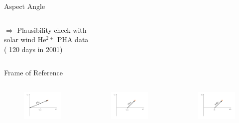 \documentclass{beamer}
\begin{document}
\begin{frame}{Aspect Angle}
\begin{columns}
\begin{center}
{\small 	$\Rightarrow$ Plausibility check with \\solar wind $\mathrm{He^{2+}}$ PHA data}\\{\scriptsize  ( 120 days in 2001)}
\end{center}
	\column[]{1cm}
\end{columns}


\end{frame}


\begin{frame}{Frame of Reference}
\begin{columns}
\column[]{5cm}
\vspace{-1cm}
	\begin{figure}
		\includegraphics[scale=2.2]{Pics/vspace_sc_trans.pdf}
	\end{figure}
	\vspace{-1.2cm}
	\begin{figure}
	\includegraphics[scale=2.2]{Pics/vspace_sw_trans.pdf}
\end{figure}


\column[]{6.2cm}
	\vspace{.5cm}
	\begin{figure}
		\includegraphics[scale=2.2]{Pics/wspace_sw_trans.pdf}
	\end{figure}
\end{columns}
\end{frame}

\end{document}
